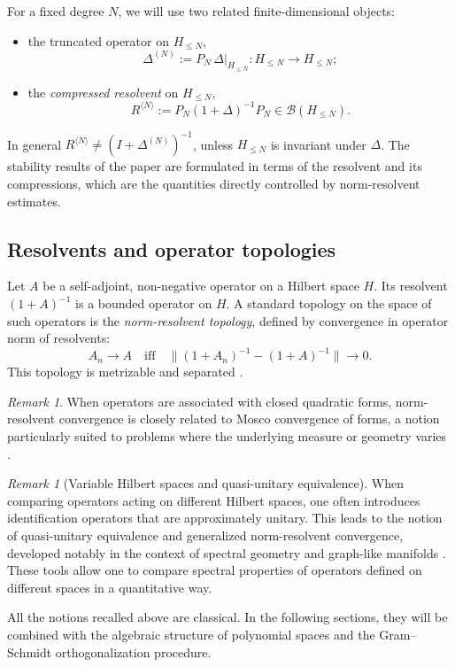 \documentclass{amsart}
\numberwithin{equation}{section}
\theoremstyle{definition}
\theoremstyle{remark}
\newtheorem{remark}[theorem]{Remark}
\begin{document}
For a fixed degree $N$, we will use two related finite-dimensional objects:
\begin{itemize}[leftmargin=2em]
\item the truncated operator on $H_{\le N}$,
\[
\Delta^{(N)}:=P_N\,\Delta\big|_{H_{\le N}}:H_{\le N}\to H_{\le N};
\]
\item the \emph{compressed resolvent} on $H_{\le N}$,
\[
R^{\langle N\rangle}:=P_N(1+\Delta)^{-1}P_N\in\mathcal B(H_{\le N}).
\]
\end{itemize}
In general $R^{\langle N\rangle}\neq (I+\Delta^{(N)})^{-1}$, unless $H_{\le N}$ is invariant under $\Delta$.
The stability results of the paper are formulated in terms of the resolvent and its compressions,
which are the quantities directly controlled by norm-resolvent estimates.
\subsection{Resolvents and operator topologies}

Let $A$ be a self-adjoint, non-negative operator on a Hilbert space $H$.
Its resolvent $(1+A)^{-1}$ is a bounded operator on $H$.
A standard topology on the space of such operators is the \emph{norm-resolvent topology},
defined by convergence in operator norm of resolvents:
\[
A_n \to A \quad \text{iff} \quad \|(1+A_n)^{-1}-(1+A)^{-1}\|\to 0.
\]
This topology is metrizable and separated
\cite{Kato}.

\begin{remark}
When operators are associated with closed quadratic forms, norm-resolvent convergence is
closely related to Mosco convergence of forms, a notion particularly suited to problems where
the underlying measure or geometry varies \cite{Mosco,KuwaeShioya}.
\end{remark}

\begin{remark}[Variable Hilbert spaces and quasi-unitary equivalence]

When comparing operators acting on different Hilbert spaces, one often introduces
identification operators that are approximately unitary.
This leads to the notion of quasi-unitary equivalence and generalized norm-resolvent convergence,
developed notably in the context of spectral geometry and graph-like manifolds
\cite{Post}.
These tools allow one to compare spectral properties of operators defined on
different spaces in a quantitative way.
\end{remark}

All the notions recalled above are classical.
In the following sections, they will be combined with the algebraic structure of polynomial
spaces and the Gram--Schmidt orthogonalization procedure.
\end{document}
